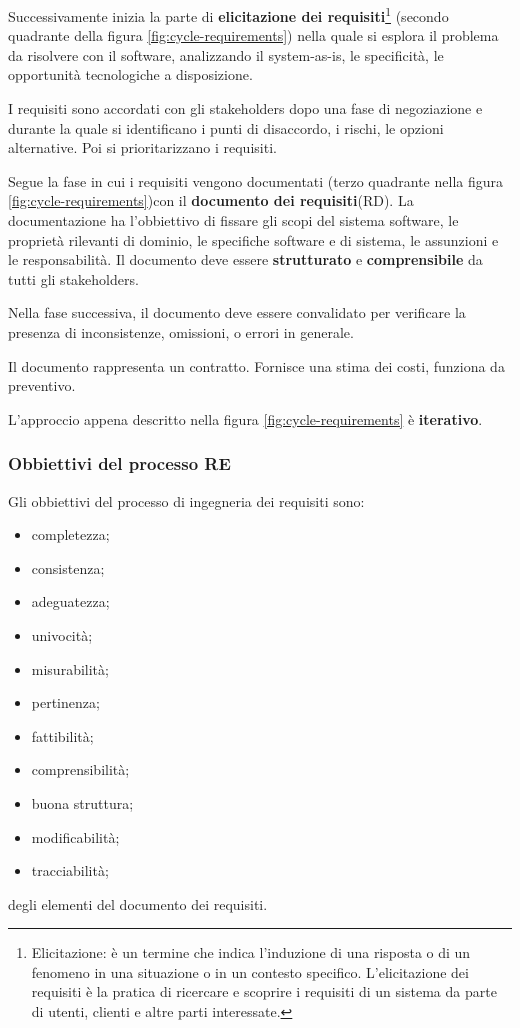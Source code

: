 \documentclass[italian]{article}
\begin{document}
		 Successivamente inizia la parte di \textbf{elicitazione dei requisiti}\footnote{Elicitazione: è un termine che indica l'induzione di una risposta o di un fenomeno in una situazione o in un contesto specifico. L'elicitazione dei requisiti è la pratica di ricercare e scoprire i requisiti di un sistema da parte di utenti, clienti e altre parti interessate.} (secondo quadrante della figura \ref{fig:cycle-requirements}) nella quale si esplora il problema da risolvere con il software, analizzando il system-as-is, le specificità, le opportunità tecnologiche a disposizione.

		 I requisiti sono accordati con gli stakeholders dopo una fase di negoziazione e durante la quale si identificano i punti di disaccordo, i rischi, le opzioni alternative. Poi si prioritarizzano i requisiti.

		 Segue la fase in cui i requisiti vengono documentati (terzo quadrante nella figura \ref{fig:cycle-requirements})con il \textbf{documento dei requisiti}(RD). La documentazione ha l'obbiettivo di fissare gli scopi del sistema software, le proprietà rilevanti di dominio, le specifiche software e di sistema, le assunzioni e le responsabilità. Il documento deve essere \textbf{strutturato} e \textbf{comprensibile} da tutti gli stakeholders.

		 Nella fase successiva, il documento deve essere convalidato per verificare la presenza di inconsistenze, omissioni, o errori in generale.

		 Il documento rappresenta un contratto. Fornisce una stima dei costi, funziona da preventivo.

		 L'approccio appena descritto nella figura \ref{fig:cycle-requirements} è \textbf{iterativo}.
		 \subsubsection{Obbiettivi del processo RE}
		Gli obbiettivi del processo di ingegneria dei requisiti sono:
		\begin{itemize}

			\item completezza;
			\item consistenza;
			\item adeguatezza;
			\item univocità;
			\item misurabilità;
			\item pertinenza;
			\item fattibilità;
			\item comprensibilità;
			\item buona struttura;
			\item modificabilità;
			\item tracciabilità;
		\end{itemize}
		degli elementi del documento dei requisiti.
\end{document}
